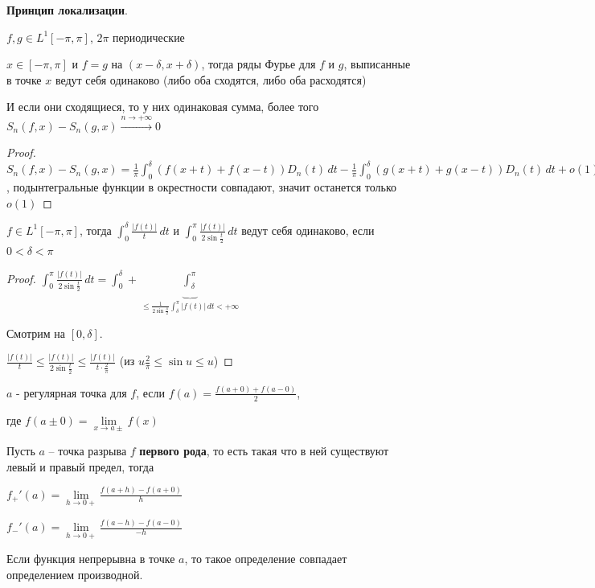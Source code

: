 \begin{consequence}
    \textbf{Принцип локализации}.

    $f, g \in L^1 [-\pi, \pi]$, $2\pi$ периодические

    $x \in [-\pi, \pi]$ и $f = g$ на $(x - \delta, x + \delta)$, тогда ряды Фурье для $f$ и $g$, выписанные в точке $x$ ведут себя одинаково (либо оба сходятся, либо оба расходятся)

    И если они сходящиеся, то у них одинаковая сумма, более того $S_n (f, x) - S_n (g, x) \overset{n \to +\infty}{\rightarrow} 0$
\end{consequence}

\begin{proof}
    $S_n (f, x) - S_n (g, x) = \frac{1}{\pi} \int_0^\delta (f(x + t) + f(x - t)) D_n (t) \, dt - \frac{1}{\pi} \int_0^\delta (g(x + t) + g(x - t)) D_n (t) \, dt + o(1)$, подынтегральные функции в окрестности совпадают, значит останется только $o(1)$
\end{proof}


\begin{lemma}
    $f \in L^1 [-\pi, \pi]$, тогда $\int_0^\delta \frac{|f(t)|}{t} \, dt$ и $\int_0^\pi \frac{|f(t)|}{2\sin \frac{t}{2}} \, dt$ ведут себя одинаково, 
    если $0 < \delta < \pi$
\end{lemma}

\begin{proof}
    $\int_0^\pi \frac{|f(t)|}{2\sin \frac{t}{2}} \, dt = \int_0^\delta + \underbrace{\int_\delta^\pi}_{\leqslant \frac{1}{2\sin \frac{\delta}{2}} \int_\delta^\pi |f(t)| \, dt < +\infty } $

    Смотрим на $[0, \delta]$.
    
    $\frac{|f(t)|}{t} \leqslant \frac{|f(t)|}{2 \sin \frac{t}{2}} \leqslant \frac{|f(t)|}{t \cdot \frac{2}{\pi}}$ (из $u \frac{2}{\pi} \leqslant \sin u \leqslant u$)
\end{proof}


\begin{definition}
    $a$ - регулярная точка для $f$, если $f(a) = \frac{f(a + 0) + f(a - 0)}{2}$,
    
    где $f(a \pm 0) = \lim\limits_{x \to a\pm} f(x)$
\end{definition}

\begin{definition}
    Пусть $a$ -- точка разрыва $f$ \textbf{первого рода}, то есть такая что в ней существуют левый и правый предел, тогда

    $f_+' (a) = \lim\limits_{h \to 0+} \frac{f(a + h) - f(a + 0)}{h}$

    $f_-' (a) = \lim\limits_{h \to 0+} \frac{f(a - h) - f(a - 0)}{-h}$

    Если функция непрерывна в точке $a$, то такое определение совпадает определением производной.
\end{definition}


